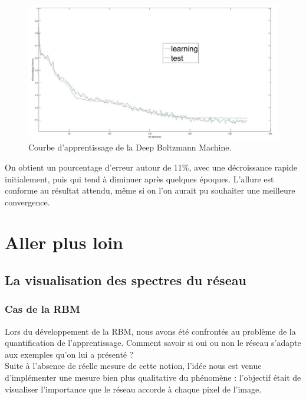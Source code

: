 \documentclass[a4paper,oneside]{report}
\begin{document}
                \begin{figure}[!ht]
                    \begin{center}
                        \centerline{\includegraphics[scale=0.45]{Images/courbeDBM.jpg}}
                    \end{center}
                    \caption{Courbe d'apprentissage de la Deep Boltzmann Machine.}
                \end{figure}

On obtient un pourcentage d'erreur autour de 11\%, avec une décroissance rapide initialement, puis qui tend à diminuer après quelques époques. L'allure est conforme au résultat attendu, même si on l'on aurait pu souhaiter une meilleure convergence.


        \chapter{Aller plus loin}

            \section{La visualisation des spectres du réseau}

\subsection{Cas de la RBM}

                Lors du développement de la RBM, nous avons été confrontés au problème de la quantification de l'apprentissage. Comment savoir si oui ou non le réseau s'adapte aux exemples qu'on lui a présenté ?\\

                Suite à l'absence de réelle mesure de cette notion, l'idée nous est venue d'implémenter une mesure bien plus qualitative du phénomène : l'objectif était de visualiser l'importance que le réseau accorde à chaque pixel de l'image.\\
\end{document}
